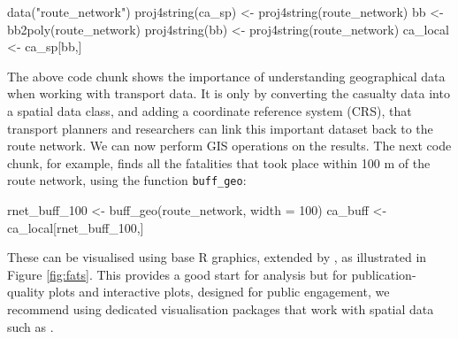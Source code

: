 \begin{Schunk}
\begin{Sinput}
data("route_network")
proj4string(ca_sp) <- proj4string(route_network)
bb <- bb2poly(route_network)
proj4string(bb) <- proj4string(route_network)
ca_local <- ca_sp[bb,]
\end{Sinput}
\end{Schunk}

The above code chunk shows the importance of understanding geographical
data when working with transport data. It is only by converting the
casualty data into a spatial data class, and adding a coordinate
reference system (CRS), that transport planners and researchers can link
this important dataset back to the route network. We can now perform GIS
operations on the results. The next code chunk, for example, finds all
the fatalities that took place within 100 m of the route network, using
the function \texttt{buff\_geo}:

\begin{Schunk}
\begin{Sinput}
rnet_buff_100 <- buff_geo(route_network, width = 100)
ca_buff <- ca_local[rnet_buff_100,]
\end{Sinput}
\end{Schunk}

These can be visualised using base R graphics, extended by ,
as illustrated in Figure \ref{fig:fats}. This provides a good start for
analysis but for publication-quality plots and interactive plots,
designed for public engagement, we recommend using dedicated
visualisation packages that work with spatial data such as
.

